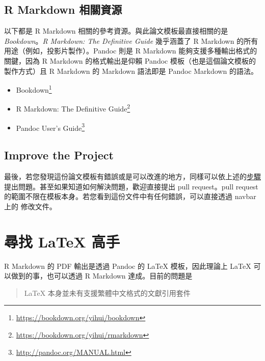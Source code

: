 \documentclass[oneside]{book}
\renewcommand{\href}[2]{#2\footnote{\url{#1}}}
\renewcommand{\appendixname}{附錄}
\theoremstyle{definition}
\theoremstyle{definition}
\theoremstyle{definition}
\theoremstyle{remark}
\begin{document}
\hypertarget{rmd-resources}{%
\section*{R Markdown 相關資源}\label{rmd-resources}}

以下都是 R Markdown 相關的參考資源。與此論文模板最直接相關的是 \emph{Bookdown}。\emph{R Markdown: The Definitive Guide} 幾乎涵蓋了 R Markdown 的所有用途（例如，投影片製作）。Pandoc 則是 R Markdown 能夠支援多種輸出格式的關鍵，因為 R Markdown 的格式輸出是仰賴 Pandoc 模板（也是這個論文模板的製作方式）且 R Markdown 的 Markdown 語法即是 Pandoc Markdown 的語法。

\begin{itemize}
\item
  \href{https://bookdown.org/yihui/bookdown}{Bookdown}
\item
  \href{https://bookdown.org/yihui/rmarkdown}{R Markdown: The Definitive Guide}
\item
  \href{http://pandoc.org/MANUAL.html}{Pandoc User's Guide}
\end{itemize}

\hypertarget{improve-the-project}{%
\section*{Improve the Project}\label{improve-the-project}}

最後，若您發現這份論文模板有錯誤或是可以改進的地方，同樣可以依上述的\protect\hyperlink{issue}{步驟}提出問題。甚至如果知道如何解決問題，歡迎直接提出 pull request。pull request 的範圍不限在模板本身。若您看到這份文件中有任何錯誤，可以直接透過 navbar 上的 修改文件。

\hypertarget{appendix-ux9644ux9304}{%
\appendix \addcontentsline{toc}{chapter}{\appendixname}}


\hypertarget{latex-cite-pkg}{%
\chapter{尋找 LaTeX 高手}\label{latex-cite-pkg}}

R Markdown 的 PDF 輸出是透過 Pandoc 的 LaTeX 模板，因此理論上 LaTeX 可以做到的事，也可以透過 R Markdown 達成。目前的問題是

\begin{quote}
LaTeX 本身並未有支援繁體中文格式的文獻引用套件
\end{quote}
\end{document}
